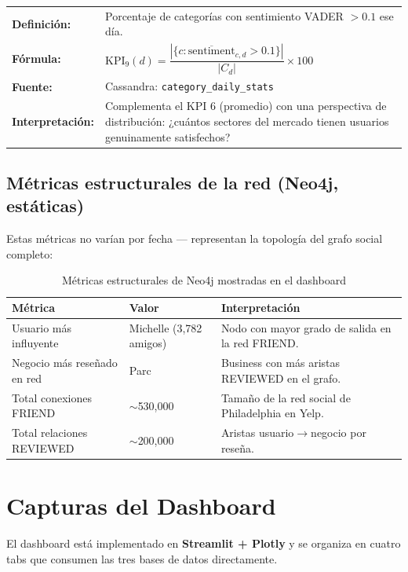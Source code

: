 \documentclass[12pt,a4paper]{article}
\begin{document}
\begin{tabular}{>{\bfseries}l >{\raggedright\arraybackslash}p{10.5cm}}
\textbf{Definición:} & Porcentaje de categorías con sentimiento VADER $> 0.1$ ese día. \\
\textbf{Fórmula:} & $\text{KPI}_9(d) = \dfrac{|\{c : \overline{\text{sentiment}}_{c,d} > 0.1\}|}{|C_d|} \times 100$ \\
\textbf{Fuente:} & Cassandra: \texttt{category\_daily\_stats} \\
\textbf{Interpretación:} & Complementa el KPI 6 (promedio) con una perspectiva de distribución: ¿cuántos sectores del mercado tienen usuarios genuinamente satisfechos? \\
\end{tabular}

\subsection{Métricas estructurales de la red (Neo4j, estáticas)}

Estas métricas no varían por fecha — representan la topología del grafo social completo:

\begin{table}[H]
\centering
\caption{Métricas estructurales de Neo4j mostradas en el dashboard}
\begin{tabular}{llp{6cm}}
\toprule
\textbf{Métrica} & \textbf{Valor} & \textbf{Interpretación} \\
\midrule
Usuario más influyente & Michelle (3,782 amigos) & Nodo con mayor grado de salida en la red FRIEND. \\
Negocio más reseñado en red & Parc & Business con más aristas REVIEWED en el grafo. \\
Total conexiones FRIEND & $\sim$530,000 & Tamaño de la red social de Philadelphia en Yelp. \\
Total relaciones REVIEWED & $\sim$200,000 & Aristas usuario$\to$negocio por reseña. \\
\bottomrule
\end{tabular}
\end{table}

\section{Capturas del Dashboard}

El dashboard está implementado en \textbf{Streamlit + Plotly} y se organiza en cuatro tabs
que consumen las tres bases de datos directamente.
\end{document}
